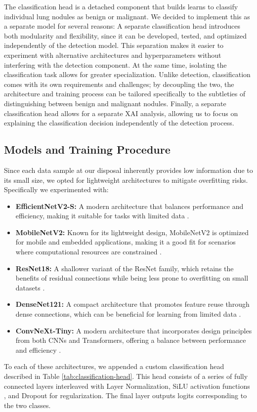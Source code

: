 The classification head is a detached component that builds learns to classify individual lung nodules as benign or malignant.
We decided to implement this as a separate model for several reasons:
A separate classification head introduces both modularity and flexibility, since it can be developed, tested, and optimized independently of the detection model. This separation makes it easier to experiment with alternative architectures and hyperparameters without interfering with the detection component. At the same time, isolating the classification task allows for greater specialization. Unlike detection, classification comes with its own requirements and challenges; by decoupling the two, the architecture and training process can be tailored specifically to the subtleties of distinguishing between benign and malignant nodules.
Finally, a separate classification head allows for a separate XAI analysis, allowing us to focus on explaining the classification decision independently of the detection process.

\subsection{Models and Training Procedure}
Since each data sample at our disposal inherently provides low information due to its small size, we opted for lightweight architectures to mitigate overfitting risks.
Specifically we experimented with:
\begin{itemize}
    \item \textbf{EfficientNetV2-S:} A modern architecture that balances performance and efficiency, making it suitable for tasks with limited data \cite{tan2020efficientnet}.
    \item \textbf{MobileNetV2:} Known for its lightweight design, MobileNetV2 is optimized for mobile and embedded applications, making it a good fit for scenarios where computational resources are constrained \cite{sandler2019mobilenetv2}.
    \item \textbf{ResNet18:} A shallower variant of the ResNet family, which retains the benefits of residual connections while being less prone to overfitting on small datasets \cite{he2015resnet}.
    \item \textbf{DenseNet121:} A compact architecture that promotes feature reuse through dense connections, which can be beneficial for learning from limited data \cite{huang2018densenet121}.
    \item \textbf{ConvNeXt-Tiny:} A modern architecture that incorporates design principles from both CNNs and Transformers, offering a balance between performance and efficiency \cite{liu2022convnext}.
\end{itemize}
To each of these architectures, we appended a custom classification head described in Table \ref{tab:classification-head}. This head consists of a series of fully connected layers interleaved with Layer Normalization, SiLU activation functions \cite{elfwing2017silu}, and Dropout for regularization. The final layer outputs logits corresponding to the two classes.

